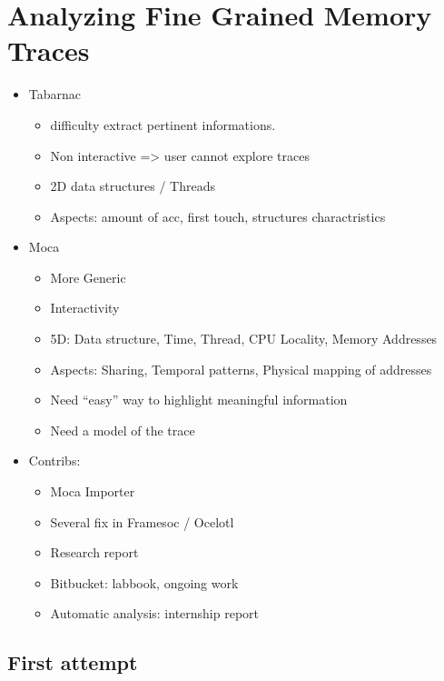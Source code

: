 \chapter{Analyzing Fine Grained Memory Traces}

\begin{itemize}
    \item \gls{Tabarnac}
        \begin{itemize}
            \item difficulty extract pertinent informations.
            \item Non interactive => user cannot explore traces
            \item 2D data structures / Threads
            \item Aspects: amount of acc, first touch, structures charactristics
        \end{itemize}
    \item \gls{Moca}
        \begin{itemize}
            \item More Generic
            \item Interactivity 
            \item 5D: Data structure, Time, Thread, CPU Locality, Memory Addresses
            \item Aspects: Sharing, Temporal patterns, Physical mapping of addresses
            \item Need “easy” way to highlight meaningful information
            \item Need a model of the trace
        \end{itemize}
    \item Contribs:
        \begin{itemize}
            \item  Moca Importer
            \item  Several fix in Framesoc / Ocelotl
            \item  Research report
            \item  Bitbucket: labbook, ongoing work
            \item  Automatic analysis: internship report
        \end{itemize}
\end{itemize}

\section{First attempt}

